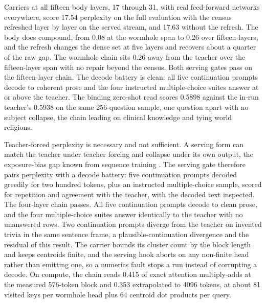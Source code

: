 \documentclass[11pt]{article}
\begin{document}
Carriers at all fifteen body layers, 17 through 31, with real
feed-forward networks everywhere, score 17.54 perplexity on the
full evaluation with the census refreshed layer by layer on the
served stream, and 17.63 without the refresh. The body does
compound, from 0.08 at the wormhole span to 0.26 over fifteen
layers, and
the refresh changes the dense set at five layers and recovers about
a quarter of the raw gap. The wormhole chain
sits 0.26 away from the teacher over the fifteen-layer span with
no repair beyond the census. Both serving gates pass on the
fifteen-layer chain. The decode battery is clean: all five
continuation prompts decode to coherent prose and the four
instructed multiple-choice suites answer at or above the
teacher. The binding zero-shot read scores 0.5898 against the
in-run teacher's 0.5938 on the same 256-question sample, one
question apart with no subject collapse, the chain leading on
clinical knowledge and tying world religions.

Teacher-forced perplexity is necessary and not sufficient. A
serving form can match the teacher under teacher forcing and
collapse under its own output, the exposure-bias gap known from
sequence training \cite{bengio2015}. The serving gate therefore
pairs perplexity with a decode battery: five continuation prompts
decoded greedily for two hundred tokens, plus an instructed
multiple-choice sample, scored for repetition \cite{holtzman2020}
and agreement with the teacher, with the decoded text inspected.
The four-layer chain passes. All five continuation prompts decode
to clean prose, and the four multiple-choice suites answer
identically to the teacher with no unanswered rows. Two
continuation prompts diverge from the teacher on invented trivia in
the same sentence frame, a plausible-continuation divergence and
the residual of this result. The carrier bounds its cluster count
by the block length and keeps centroids finite, and the serving
hook aborts on any non-finite head rather than emitting one, so a
numerics fault stops a run instead of corrupting a decode. On
compute, the chain reads 0.415 of exact attention multiply-adds at
the measured 576-token block and 0.353 extrapolated to 4096
tokens, at about 81 visited keys per wormhole head plus 64 centroid
dot products per query.
\end{document}
